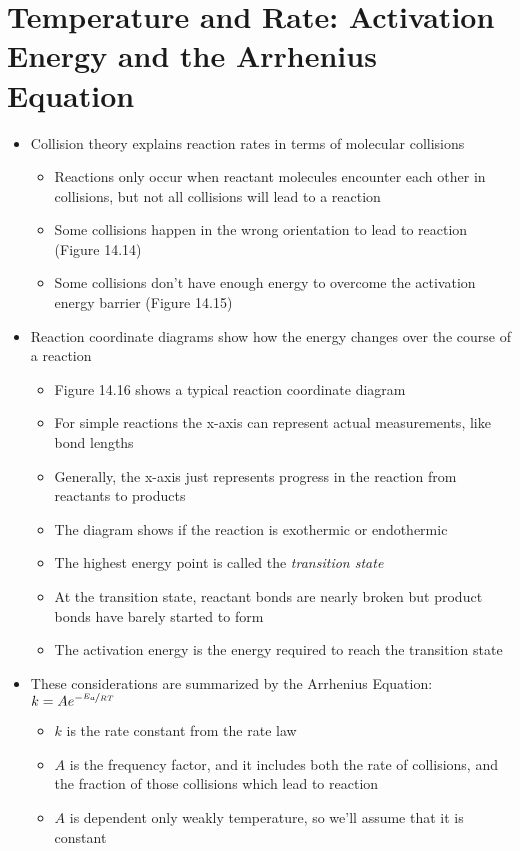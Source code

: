 \documentclass[12pt, openany, letterpaper]{memoir}
\begin{document}
\section{Temperature and Rate: Activation Energy and the Arrhenius Equation}
\begin{itemize}
	\item Collision theory explains reaction rates in terms of molecular collisions
	\begin{itemize}
		\item Reactions only occur when reactant molecules encounter each other in collisions, but not all collisions will lead to a reaction
		\item Some collisions happen in the wrong orientation to lead to reaction (Figure 14.14)
		\item Some collisions don't have enough energy to overcome the activation energy barrier (Figure 14.15)
  \end{itemize}
	\item Reaction coordinate diagrams show how the energy changes over the course of a reaction
	\begin{itemize}
		\item Figure 14.16 shows a typical reaction coordinate diagram
		\item For simple reactions the x-axis can represent actual measurements, like bond lengths
		\item Generally, the x-axis just represents progress in the reaction from reactants to products
		\item The diagram shows if the reaction is exothermic or endothermic
		\item The highest energy point is called the \emph{transition state}
		\item At the transition state, reactant bonds are nearly broken but product bonds have barely started to form
		\item The activation energy is the energy required to reach the transition state
	\end{itemize}
  \item These considerations are summarized by the Arrhenius Equation: $k=Ae^{-\nicefrac{E_a}{RT}}$
  \begin{itemize}
		\item $k$ is the rate constant from the rate law
		\item $A$ is the frequency factor, and it includes both the rate of collisions, and the fraction of those collisions which lead to reaction
		\item $A$ is dependent only weakly temperature, so we'll assume that it is constant

\end{itemize}
\end{itemize}
\end{document}
